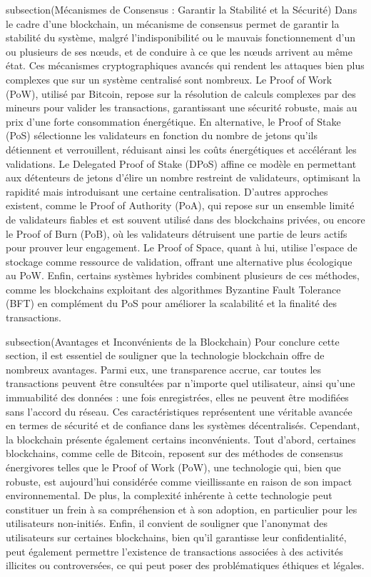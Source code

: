 subsection(Mécanismes de Consensus : Garantir la Stabilité et la Sécurité)
Dans le cadre d’une blockchain, un mécanisme de consensus permet de garantir la stabilité du système, malgré l’indisponibilité ou le mauvais fonctionnement d’un ou plusieurs de ses nœuds, et de conduire à ce que les nœuds arrivent au même état. Ces mécanismes cryptographiques avancés qui rendent les attaques bien plus complexes que sur un système centralisé sont nombreux. Le Proof of Work (PoW), utilisé par Bitcoin, repose sur la résolution de calculs complexes par des mineurs pour valider les transactions, garantissant une sécurité robuste, mais au prix d’une forte consommation énergétique. En alternative, le Proof of Stake (PoS) sélectionne les validateurs en fonction du nombre de jetons qu’ils détiennent et verrouillent, réduisant ainsi les coûts énergétiques et accélérant les validations. Le Delegated Proof of Stake (DPoS) affine ce modèle en permettant aux détenteurs de jetons d’élire un nombre restreint de validateurs, optimisant la rapidité mais introduisant une certaine centralisation. D’autres approches existent, comme le Proof of Authority (PoA), qui repose sur un ensemble limité de validateurs fiables et est souvent utilisé dans des blockchains privées, ou encore le Proof of Burn (PoB), où les validateurs détruisent une partie de leurs actifs pour prouver leur engagement. Le Proof of Space, quant à lui, utilise l’espace de stockage comme ressource de validation, offrant une alternative plus écologique au PoW. Enfin, certains systèmes hybrides combinent plusieurs de ces méthodes, comme les blockchains exploitant des algorithmes Byzantine Fault Tolerance (BFT) en complément du PoS pour améliorer la scalabilité et la finalité des transactions.

subsection(Avantages et Inconvénients de la Blockchain)
Pour conclure cette section, il est essentiel de souligner que la technologie blockchain offre de nombreux avantages. Parmi eux, une transparence accrue, car toutes les transactions peuvent être consultées par n’importe quel utilisateur, ainsi qu’une immuabilité des données : une fois enregistrées, elles ne peuvent être modifiées sans l’accord du réseau. Ces caractéristiques représentent une véritable avancée en termes de sécurité et de confiance dans les systèmes décentralisés.
Cependant, la blockchain présente également certains inconvénients. Tout d'abord, certaines blockchains, comme celle de Bitcoin, reposent sur des méthodes de consensus énergivores telles que le Proof of Work (PoW), une technologie qui, bien que robuste, est aujourd'hui considérée comme vieillissante en raison de son impact environnemental. De plus, la complexité inhérente à cette technologie peut constituer un frein à sa compréhension et à son adoption, en particulier pour les utilisateurs non-initiés. Enfin, il convient de souligner que l'anonymat des utilisateurs sur certaines blockchains, bien qu'il garantisse leur confidentialité, peut également permettre l'existence de transactions associées à des activités illicites ou controversées, ce qui peut poser des problématiques éthiques et légales.

